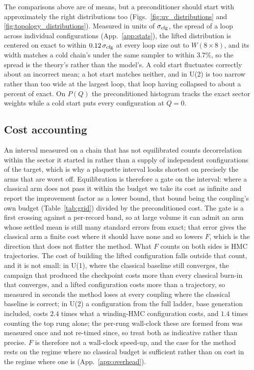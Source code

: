 \documentclass[prd, twocolumn, superscriptaddress, nofootinbib,floatfix]{revtex4-2}
\DeclareRobustCommand{\figs}[2]{Figs.~\ref{fig:#1} and \ref{fig:#2}}
\DeclareRobustCommand{\app}[1]{App.~\ref{app:#1}}
\DeclareRobustCommand{\tb}[1]{Table~\ref{tab:#1}}
\begin{document}
The comparisons above are of means, but a preconditioner should start with
approximately the right distributions too
(\figs{uv_distributions}{topology_distributions}). Measured in units of
$\sigma_{\rm cfg}$, the spread of a loop across individual configurations
(\app{stats}), the lifted distribution is centered on exact to within
$0.12\,\sigma_{\rm cfg}$ at every loop size out to $W(8\times8)$, and its width
matches a cold chain's under the same sampler to within $3.7\%$, so the spread
is the theory's rather than the model's. A cold start fluctuates correctly about
an incorrect mean; a hot start matches neither, and in U(2) is too narrow rather
than too wide at the largest loop, that loop having collapsed to about a percent
of exact. On $P(Q)$ the preconditioned histogram tracks the exact sector weights
while a cold start puts every configuration at $Q=0$.

\subsection{Cost accounting}
\label{sec:cost}
An interval measured on a chain that has not equilibrated counts decorrelation
within the sector it started in rather than a supply of independent
configurations of the target, which is why a plaquette interval looks shortest
on precisely the arms that are worst off. Equilibration is therefore a gate on
the interval: where a classical arm does not pass it within the budget we take
its cost as infinite and report the improvement factor as a lower bound, that
bound being the coupling's own budget (\tb{grid}) divided by the preconditioned
cost. The gate is a first crossing against a per-record band, so at large volume
it can admit an arm whose settled mean is still many standard errors from exact;
that error gives the classical arm a finite cost where it should have none and
so lowers $F$, which is the direction that does not flatter the method. What $F$
counts on both sides is HMC trajectories. The cost of building the
lifted configuration falls outside that count, and it is not small: in
U(1), where the classical baseline still converges, the campaign that produced
the checkpoint costs more than every classical burn-in that converges, and a
lifted configuration costs more than a trajectory, so measured in seconds the
method loses at every coupling where the classical baseline is correct; in U(2)
a configuration from the full ladder, base generation included, costs $2.4$
times what a winding-HMC configuration costs, and $1.4$ times counting the top
rung alone; the per-rung wall-clock these are formed from was measured once and
not re-timed since, so treat both as indicative rather than precise. $F$ is therefore not a wall-clock speed-up, and the case for the method rests on
the regime where no classical budget is sufficient rather than on cost in the
regime where one is (\app{overhead}).
\end{document}
